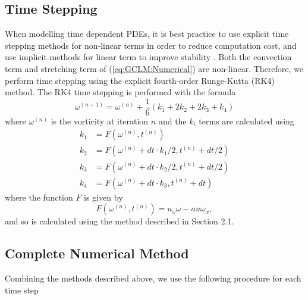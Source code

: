 \documentclass[12pt]{article}
\def\wx{\omega_x}
\def\ux{u_x}
\numberwithin{equation}{section}
\begin{document}
\subsection{Time Stepping}

When modelling time dependent PDEs, it is best practice to use explicit time stepping methods for non-linear terms in order to reduce computation cost, and use implicit methods for linear term to improve stability \cite{protas_spectral_2025}. Both the convection term and stretching term of (\ref{eq:GCLM:Numerical}) are non-linear. Therefore, we perform time stepping using the explicit fourth-order Runge-Kutta (RK4) method. The RK4 time stepping is performed with the formula
\begin{equation}\label{eq:RK4}
\omega^{(n+1)} = \omega^{(n)} + \frac{1}{6}(k_1 + 2k_2 + 2k_3 + k_4)
\end{equation}
where $\omega^{(n)}$ is the vorticity at iteration $n$ and the $k_i$ terms are calculated using
\begin{subequations}
\begin{align}
k_1 &= F(\omega^{(n)},t^{(n)})  \\
k_2 &= F(\omega^{(n)}+ dt \cdot k_1/2,t^{(n)} + dt/2)  \\
k_3 &= F(\omega^{(n)}+ dt \cdot k_2/2,t^{(n)}+ dt/2)  \\
k_4 &= F(\omega^{(n)}+ dt \cdot k_3,t^{(n)}+dt) 
\end{align}
\end{subequations}
where the function $F$ is given by
\begin{equation}\label{eq:RHS}
F(\omega^{(n)},t^{(n)}) = \ux\omega - au\wx,
\end{equation}
and so is calculated using the method described in Section 2.1.

\subsection{Complete Numerical Method}

Combining the methods described above, we use the following procedure for each time step
\end{document}
